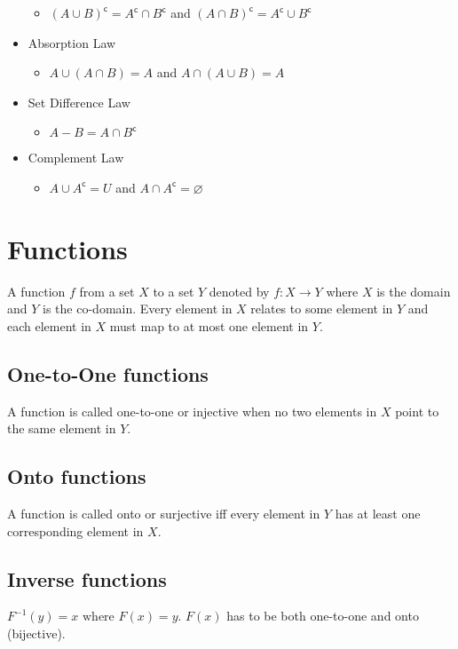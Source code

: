 \documentclass[landscape, letterpaper, 8pt]{extarticle}
\renewcommand{\complement}[1]{{#1}^\mathsf{c}}
\begin{document}
\begin{multicols}{2}
\begin{itemize}[noitemsep,nolistsep]
\begin{itemize}[noitemsep,nolistsep]
                  \item $\complement{(A \cup B)} = \complement{A} \cap \complement{B}$ and $\complement{(A \cap B)} = \complement{A} \cup \complement{B}$
              \end{itemize}
        \item Absorption Law
              \begin{itemize}[noitemsep,nolistsep]
                  \item $A \cup (A \cap B) = A$ and $A \cap (A \cup B) = A$
              \end{itemize}
        \item Set Difference Law
              \begin{itemize}[noitemsep,nolistsep]
                  \item $A-B = A \cap \complement{B}$
              \end{itemize}
        \item Complement Law
              \begin{itemize}[noitemsep,nolistsep]
                  \item $A\cup \complement{A} = U$ and $A \cap \complement{A} = \varnothing$
              \end{itemize}
    \end{itemize}
    \section*{Functions}
    A function $f$ from a set $X$ to a set $Y$ denoted by $f: X \to Y$ where $X$ is the domain and $Y$ is the co-domain.
    Every element in $X$ relates to some element in $Y$ and each element in $X$ must map to at most one element in $Y$.
    \subsection*{One-to-One functions}
    A function is called one-to-one or injective when no two elements in $X$ point to the same element in $Y$.
    \subsection*{Onto functions}
    A function is called onto or surjective iff every element in $Y$ has at least one corresponding element in $X$.
    \subsection*{Inverse functions}
    $F^{-1}(y) = x\text{ where }F(x) = y$.
    $F(x)$ has to be both one-to-one and onto (bijective).

\end{multicols}
\end{document}
